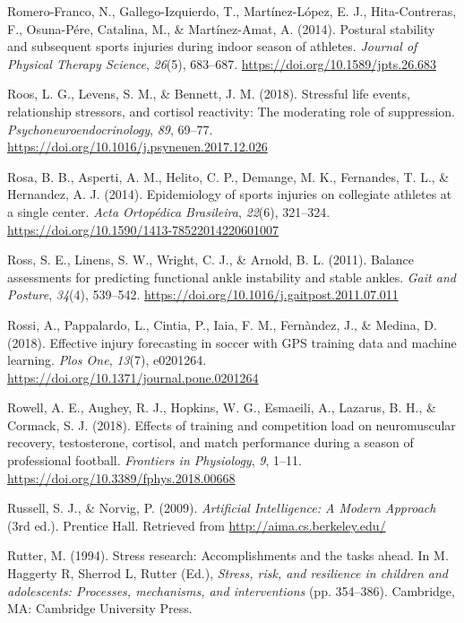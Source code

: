 \documentclass[
  english,
  man,floatsintext]{apa6}
\begin{document}
\leavevmode\hypertarget{ref-Romero-Franco2014}{}%
Romero-Franco, N., Gallego-Izquierdo, T., Martínez-López, E. J., Hita-Contreras, F., Osuna-Pére, Catalina, M., \& Martínez-Amat, A. (2014). Postural stability and subsequent sports injuries during indoor season of athletes. \emph{Journal of Physical Therapy Science}, \emph{26}(5), 683--687. \url{https://doi.org/10.1589/jpts.26.683}

\leavevmode\hypertarget{ref-Roos2018}{}%
Roos, L. G., Levens, S. M., \& Bennett, J. M. (2018). Stressful life events, relationship stressors, and cortisol reactivity: The moderating role of suppression. \emph{Psychoneuroendocrinology}, \emph{89}, 69--77. \url{https://doi.org/10.1016/j.psyneuen.2017.12.026}

\leavevmode\hypertarget{ref-Rosa2014}{}%
Rosa, B. B., Asperti, A. M., Helito, C. P., Demange, M. K., Fernandes, T. L., \& Hernandez, A. J. (2014). Epidemiology of sports injuries on collegiate athletes at a single center. \emph{Acta Ortopédica Brasileira}, \emph{22}(6), 321--324. \url{https://doi.org/10.1590/1413-78522014220601007}

\leavevmode\hypertarget{ref-Ross2011}{}%
Ross, S. E., Linens, S. W., Wright, C. J., \& Arnold, B. L. (2011). Balance assessments for predicting functional ankle instability and stable ankles. \emph{Gait and Posture}, \emph{34}(4), 539--542. \url{https://doi.org/10.1016/j.gaitpost.2011.07.011}

\leavevmode\hypertarget{ref-Rossi2018}{}%
Rossi, A., Pappalardo, L., Cintia, P., Iaia, F. M., Fernàndez, J., \& Medina, D. (2018). Effective injury forecasting in soccer with GPS training data and machine learning. \emph{Plos One}, \emph{13}(7), e0201264. \url{https://doi.org/10.1371/journal.pone.0201264}

\leavevmode\hypertarget{ref-Rowell2018}{}%
Rowell, A. E., Aughey, R. J., Hopkins, W. G., Esmaeili, A., Lazarus, B. H., \& Cormack, S. J. (2018). Effects of training and competition load on neuromuscular recovery, testosterone, cortisol, and match performance during a season of professional football. \emph{Frontiers in Physiology}, \emph{9}, 1--11. \url{https://doi.org/10.3389/fphys.2018.00668}

\leavevmode\hypertarget{ref-Norvig2009}{}%
Russell, S. J., \& Norvig, P. (2009). \emph{Artificial Intelligence: A Modern Approach} (3rd ed.). Prentice Hall. Retrieved from \url{http://aima.cs.berkeley.edu/}

\leavevmode\hypertarget{ref-Rutter1994}{}%
Rutter, M. (1994). Stress research: Accomplishments and the tasks ahead. In M. Haggerty R, Sherrod L, Rutter (Ed.), \emph{Stress, risk, and resilience in children and adolescents: Processes, mechanisms, and interventions} (pp. 354--386). Cambridge, MA: Cambridge University Press.
\end{document}
